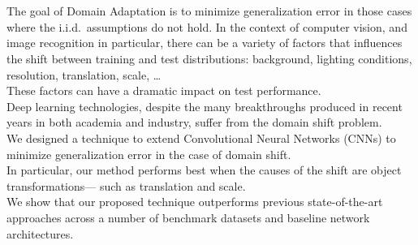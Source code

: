 \documentclass[../main.tex]{subfiles}
\begin{document}
    \section*{}
    \begin{doublespace}
    The goal of Domain Adaptation is to minimize generalization error in those cases where the
    i.i.d.\ assumptions do not hold. In the context of computer vision, and image recognition
    in particular, there can be a variety of factors that influences the shift between
    training and test distributions: background, lighting conditions, resolution, translation, scale, \ldots \\
    These factors can have a dramatic impact on test performance. \\
    Deep learning technologies, despite the many breakthroughs produced in recent years in both academia and
    industry, suffer from the domain shift problem. \\
    We designed a technique to extend Convolutional Neural Networks (CNNs) to minimize generalization
    error in the case of domain shift. \\
    In particular, our method performs best when the causes of the shift are object transformations---
    such as translation and scale. \\
    We show that our proposed technique outperforms previous state-of-the-art approaches across a number
    of benchmark datasets and baseline network architectures.
    \end{doublespace}
\end{document}
